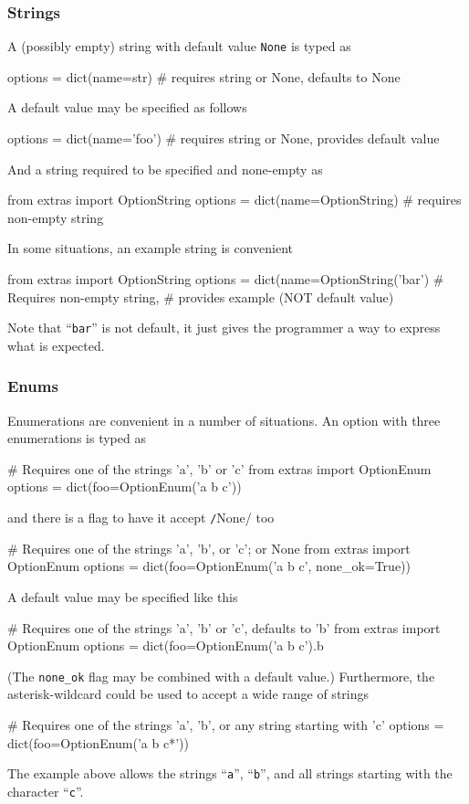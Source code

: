 \subsubsection*{Strings}
A (possibly empty) string with default value \texttt{None} is typed as
\begin{python}
options = dict(name=str)     # requires string or None, defaults to None
\end{python}
A default value may be specified as follows
\begin{python}
options = dict(name='foo')   # requires string or None, provides default value
\end{python}
And a string required to be specified and none-empty as
\begin{python}
from extras import OptionString
options = dict(name=OptionString)       # requires non-empty string
\end{python}
In some situations, an example string is convenient
\begin{python}
from extras import OptionString
options = dict(name=OptionString('bar') # Requires non-empty string,
                                        # provides example (NOT default value)

\end{python}
Note that ``\texttt{bar}'' is not default, it just gives the
programmer a way to express what is expected.



\subsubsection*{Enums}
Enumerations are convenient in a number of situations.  An option with
three enumerations is typed as
\begin{python}
# Requires one of the strings 'a', 'b' or 'c'
from extras import OptionEnum
options = dict(foo=OptionEnum('a b c'))
\end{python}
and there is a flag to have it accept \texttt/None/ too
\begin{python}
# Requires one of the strings 'a', 'b', or 'c'; or None
from extras import OptionEnum
options = dict(foo=OptionEnum('a b c', none_ok=True))
\end{python}
A default value may be specified like this
\begin{python}
# Requires one of the strings 'a', 'b' or 'c', defaults to 'b'
from extras import OptionEnum
options = dict(foo=OptionEnum('a b c').b
\end{python}
(The \texttt{none\_ok} flag may be combined with a default value.)
Furthermore, the asterisk-wildcard could be used to accept a wide
range of strings
\begin{python}
# Requires one of the strings 'a', 'b', or any string starting with 'c'
options = dict(foo=OptionEnum('a b c*'))
\end{python}
The example above allows the strings ``\texttt{a}'', ``\texttt{b}'',
and all strings starting with the character ``\texttt{c}''.



